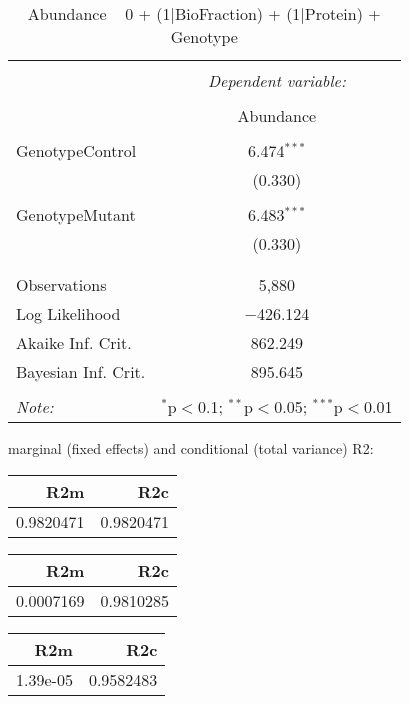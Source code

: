 \documentclass[11pt]{report}
\begin{document}
\begin{table}[!htbp] \centering 
  \caption{Abundance ~ 0 + (1|BioFraction) + (1|Protein) + Genotype} 
  \label{} 
\begin{tabular}{@{\extracolsep{5pt}}lc} 
\\[-1.8ex]\hline 
\hline \\[-1.8ex] 
 & \multicolumn{1}{c}{\textit{Dependent variable:}} \\ 
\cline{2-2} 
\\[-1.8ex] & Abundance \\ 
\hline \\[-1.8ex] 
 GenotypeControl & 6.474$^{***}$ \\ 
  & (0.330) \\ 
  & \\ 
 GenotypeMutant & 6.483$^{***}$ \\ 
  & (0.330) \\ 
  & \\ 
\hline \\[-1.8ex] 
Observations & 5,880 \\ 
Log Likelihood & $-$426.124 \\ 
Akaike Inf. Crit. & 862.249 \\ 
Bayesian Inf. Crit. & 895.645 \\ 
\hline 
\hline \\[-1.8ex] 
\textit{Note:}  & \multicolumn{1}{r}{$^{*}$p$<$0.1; $^{**}$p$<$0.05; $^{***}$p$<$0.01} \\ 
\end{tabular} 
\end{table} 
marginal (fixed effects) and conditional (total variance) R2:

\begin{tabular}{r|r}
\hline
R2m & R2c\\
\hline
0.9820471 & 0.9820471\\
\hline
\end{tabular}

\begin{tabular}{r|r}
\hline
R2m & R2c\\
\hline
0.0007169 & 0.9810285\\
\hline
\end{tabular}

\begin{tabular}{r|r}
\hline
R2m & R2c\\
\hline
1.39e-05 & 0.9582483\\
\hline
\end{tabular}
\end{document}
